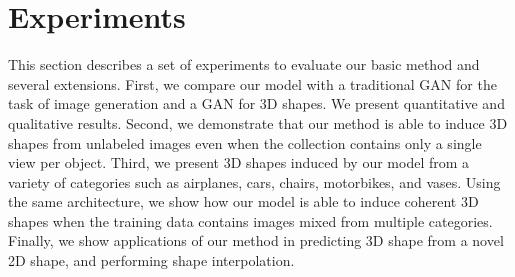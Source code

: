 \section{Experiments}\label{s:experiments}
This section describes a set of experiments to evaluate our basic
method and several extensions.
First, we compare our model with a traditional GAN for the task
of image generation and a GAN for 3D shapes.
We present quantitative and qualitative results.
Second, we demonstrate that our method is able to induce 3D shapes from
unlabeled images even when the collection contains only a single view per object.
Third, we present 3D shapes induced by our model from a variety of
categories such as airplanes, cars, chairs, motorbikes, and
vases. Using the same architecture, we show how our model is able to
induce coherent 3D shapes when the training data contains images mixed
from multiple categories.
Finally, we show applications of our method in predicting 3D shape
from a novel 2D shape, and performing shape interpolation.


